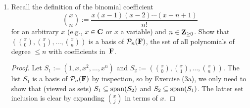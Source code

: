 \documentclass[11pt]{amsart}
\begin{document}
\begin{enumerate}[(1)]
\begin{proof}[Solution]
\begin{enumerate}
Conversely, assume $S_1 \subseteq U_2$ and $S_2 \subseteq U_1$.
Any $\u \in U_1$ can be written as a linear combination of vectors in $S_1$, and since $S_1 \subseteq U_2$, this linear combination is in $U_2$, i.e., $\u \in U_2$. This gives $U_1 \subseteq U_2$.
Switching the subscripts yields $U_2 \subseteq U_1$.

\item Since $S_1 \subseteq U_1$ and $S_2 \subseteq U_2$, any vector in $\spn \left( S_1 \cup S_2 \right)$ is in $U_1 + U_2$, i.e., $\spn \left( S_1 \cup S_2 \right) \subseteq U_1 + U_2$.

Now let $\u = \u_1 + \u_2 \in U_1 + U_2$. Then we can write $\u_1$ and $\u_2$ as linear combinations of vectors in $S_1 = \left( \s_1, \s_2, \dots, \s_m \right) $ and $S_2 = \left( \t_1, \t_2, \dots, \t_n \right) $, respectively, say
\[
  \u_1 = \sum_{ j=1 }^m a_j \, \s_j
  \qquad \text{ and } \qquad
  \u_2 = \sum_{ j=1 }^n b_j \, \t_j \, .
\]
The lists $S_1$ and $S_2$ might have vectors in common; upon possibly renumbering the two lists, we may assume that the common vectors are $\s_1 = \t_1, \s_2 = \t_2, \dots, \s_k = \t_k$. Thus we can rewrite
\[
  \u_1 = \sum_{ j=1 }^k a_j \, \s_j + \sum_{ j=k+1 }^m a_j \, \s_j
  \qquad \text{ and } \qquad
  \u_2 = \sum_{ j=1 }^k b_j \, \s_j + \sum_{ j=k+1 }^n b_j \, \t_j
\]
and so
\[
  \u = \u_1 + \u_2 = \sum_{ j=1 }^k \left( a_j + b_j \right) \s_j + \sum_{ j=k+1 }^m a_j \, \s_j + \sum_{ j=k+1 }^n b_j \, \t_j
\]
is in $\spn \left( S_1 \cup S_2 \right) = \spn \left( \s_1, \s_2, \dots, \s_m, \t_{ k+1 } , \t_{ k+2 } , \dots, \t_n \right)$. This proves $U_1 + U_2 \subseteq \spn \left( S_1 \cup S_2 \right)$. \qedhere

\end{enumerate}
\end{proof}

\item Recall the definition of the binomial coefficient
\[
  \binom x n := \frac{ x (x-1) (x-2) \cdots (x-n+1) }{ n! }
\]
for an arbitrary $x$ (e.g., $x \in \mathbf{C}$ or $x$ a variable) and $n \in \mathbf{Z}_{ \ge 0 }$.
Show that $\left( \binom x 0 , \binom x 1 , \dots, \binom x n \right)$ is a basis of $\mathcal{P}_n(\mathbf{F})$, the set of all polynomials of degree $\le n$ with coefficients in~$\mathbf{F}$.

\begin{proof}
Let $S_1 := \left( 1, x, x^2, \dots, x^n \right)$ and $S_2 := \left( \binom x 0 , \binom x 1 , \dots, \binom x n \right)$.
The list $S_1$ is a basis of $\mathcal{P}_n(\mathbf{F})$ by inspection, so by Exercise (3a), we only need to show that (viewed as sets) $S_1 \subseteq \operatorname{span}(S_2)$ and $S_2 \subseteq \operatorname{span}(S_1)$.
The latter set inclusion is clear by expanding $\binom x j$ in terms of $x$.


\end{proof}
\end{enumerate}
\end{document}
